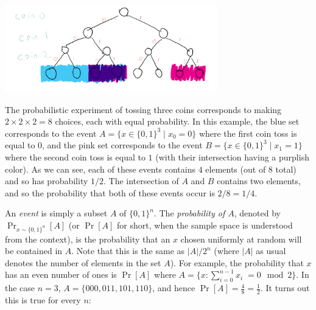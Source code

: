 \begin{marginfigure}
\centering
\includegraphics[width=\linewidth, height=1.5in, keepaspectratio]{../figure/coinexperiment.png}
\caption{The probabilistic experiment of tossing three coins corresponds
to making \(2\times 2 \times 2 = 8\) choices, each with equal
probability. In this example, the blue set corresponds to the event
\(A = \{ x\in \{0,1\}^3 \;|\; x_0 = 0 \}\) where the first coin toss is
equal to \(0\), and the pink set corresponds to the event
\(B = \{ x\in \{0,1\}^3 \;|\; x_1 = 1 \}\) where the second coin toss is
equal to \(1\) (with their intersection having a purplish color). As we
can see, each of these events contains \(4\) elements (out of \(8\)
total) and so has probability \(1/2\). The intersection of \(A\) and
\(B\) contains two elements, and so the probability that both of these
events occur is \(2/8 = 1/4\).}
\label{coinexperimentfig}
\end{marginfigure}

An \emph{event} is simply a subset \(A\) of \(\{0,1\}^n\). The
\emph{probability of \(A\)}, denoted by \(\Pr_{x\sim \{0,1\}^n}[A]\) (or
\(\Pr[A]\) for short, when the sample space is understood from the
context), is the probability that an \(x\) chosen uniformly at random
will be contained in \(A\). Note that this is the same as \(|A|/2^n\)
(where \(|A|\) as usual denotes the number of elements in the set
\(A\)). For example, the probability that \(x\) has an even number of
ones is \(\Pr[A]\) where
\(A=\{ x : \sum_{i=0}^{n-1} x_i \;= 0 \mod 2 \}\). In the case \(n=3\),
\(A=\{ 000,011,101,110 \}\), and hence
\(\Pr[A]=\tfrac{4}{8}=\tfrac{1}{2}\). It turns out this is true for
every \(n\):

\hypertarget{evenprob}{}


